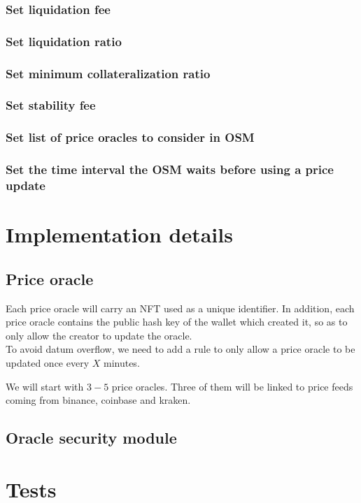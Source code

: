 \documentclass{article} %
\begin{document}
\subsubsection{Set liquidation fee}

\subsubsection{Set liquidation ratio}

\subsubsection{Set minimum collateralization ratio}

\subsubsection{Set stability fee}

\subsubsection{Set list of price oracles to consider in OSM}

\subsubsection{Set the time interval the OSM waits before using a price update}


\section{Implementation details}


\subsection{Price oracle}

Each price oracle will carry an NFT used as a unique identifier.
In addition, each price oracle contains the public hash key of the wallet which
created it, so as to only allow the creator to update the oracle. \\

To avoid datum overflow, we need to add a rule to only allow a price oracle to
be updated once every $X$ minutes.

We will start with $3-5$ price oracles.
Three of them will be linked to price feeds coming from binance, coinbase and
kraken.

\subsection{Oracle security module}

\section{Tests}


% 
\end{document}

